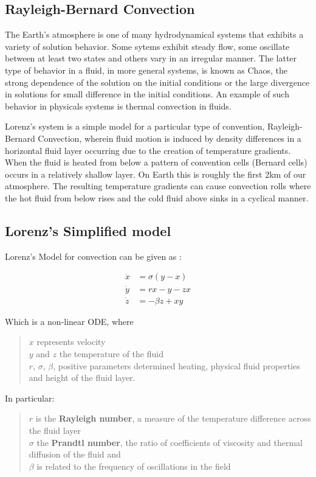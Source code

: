 \documentclass[letterpaper,titlepage,10pt]{article}
\begin{document}
\subsection{Rayleigh-Bernard Convection}
{\parindent0pt
The Earth's atmosphere is one of many hydrodynamical systems that exhibits a variety of solution behavior. Some  sytems exhibit steady flow, some oscillate between at least two states and others vary in an irregular manner. The latter type of behavior in a fluid, in more general systems, is known as Chaos, the strong dependence of the solution on the initial conditions or the large divergence in solutions for small difference in the initial conditions.  An example of such behavior in physicals systems is thermal convection in fluids. \newline 

Lorenz's system is a simple model for a particular type of convention, Rayleigh-Bernard Convection, wherein fluid motion is induced by density differences in a horizontal fluid layer occurring due to the creation of temperature gradients.\cite{e} When the fluid is heated from below a pattern of convention cells (Bernard cells) occurs in a relatively shallow layer. On Earth this is roughly the first 2km of our atmosphere.\cite{d} The resulting temperature gradients can cause convection rolls where the hot fluid from below rises and the cold fluid above sinks in a cyclical manner. 
}
\subsection{Lorenz's Simplified model}
Lorenz's Model\cite{pa} for convection can be given as \cite{b}:

\begin{align*}
\dot{x} &= \sigma(y-x) \\
\dot{y} &= rx -y - zx  \\
\dot{z} &= -\beta z + xy 
\end{align*}

{\parindent0pt
Which is a non-linear ODE, where
\begin{flushleft}
\begin{verse}
$x$ represents velocity\\
$y$ and $z$ the temperature of the fluid \\
$r$, $\sigma$, $\beta$, positive parameters determined heating, physical fluid properties and height of the fluid layer.
\end{verse}
\end{flushleft}

In particular\cite{b}:
\begin{flushleft}
\begin{verse}
$r$ is the \textbf{Rayleigh number}, a measure of the temperature difference across the fluid layer \\
$\sigma$ the \textbf{Prandtl number}, the ratio of  coefficients of viscosity and thermal diffusion of the fluid and \\
$\beta$ is related to the frequency of oscillations in the field
\end{verse}
\end{flushleft}
}
\end{document}
